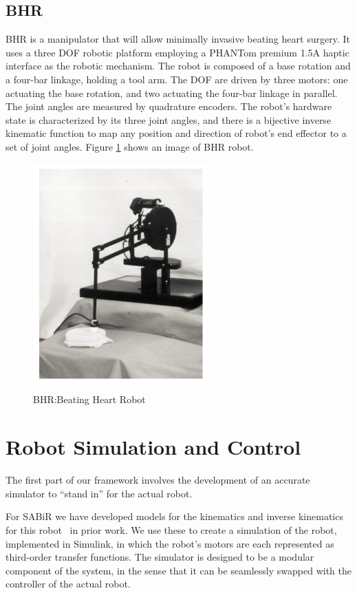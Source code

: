 \subsection{BHR}
BHR is a manipulator that will allow minimally invasive beating heart surgery. It uses a three DOF robotic platform employing a PHANTom premium 1.5A haptic interface \cite{} as the robotic mechanism. The robot is composed of a base rotation and a four-bar linkage, holding a tool arm. The DOF are driven by three motors: one actuating the base rotation, and two actuating the four-bar linkage in parallel. The joint angles are measured by quadrature encoders. The robot's hardware state is characterized by its three joint angles, and there is a bijective inverse kinematic function to map any position and direction of robot’s end effector to a set of joint angles. Figure \ref{bhr} shows an image of BHR robot.

\begin{figure}[!thpb]
\centering
\includegraphics[width=0.6\textwidth]{chapter5_BHR.pdf}
\caption{BHR:Beating Heart Robot}
\label{bhr}
\end{figure}

\section{Robot Simulation and Control}\label{robotsimulator}
The first part of our framework involves the development of an accurate simulator to ``stand in'' for the actual robot. 

For SABiR we have developed models for the kinematics and inverse kinematics for this robot~\cite{hwang2009kinematic} in prior work. We use these to create a simulation of the robot, implemented in Simulink, in which the robot's motors are each represented as third-order transfer functions. The simulator is designed to be a modular component of the system, in the sense that it can be seamlessly swapped with the controller of the actual robot.

